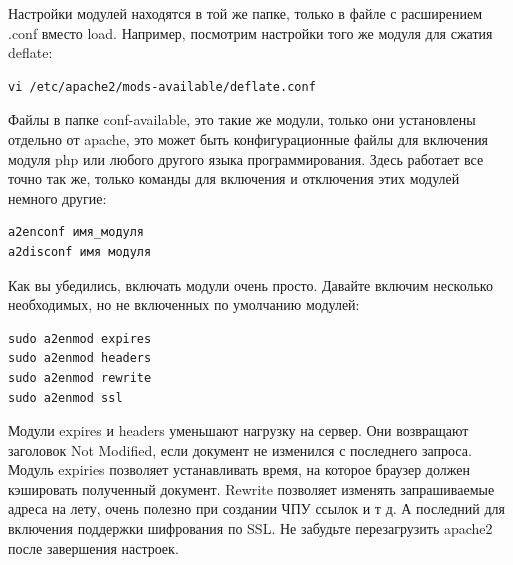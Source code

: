 \documentclass[14pt, a4paper]{article}
\begin{document}
Настройки модулей находятся в той же папке, только в файле с расширением .conf вместо load. 
Например, посмотрим настройки того же модуля для сжатия deflate:
\begin{lstlisting}
vi /etc/apache2/mods-available/deflate.conf
\end{lstlisting}
\begin{figure}[h]%
    \centering
    \label{1.10}
\end{figure}
Файлы в папке conf-available, это такие же модули, только они установлены отдельно от apache, это 
может быть конфигурационные файлы для включения модуля php или любого другого языка программирования. 
Здесь работает все точно так же, только команды для включения и отключения этих модулей немного другие:

\begin{lstlisting}
a2enconf имя_модуля
a2disconf имя модуля   
\end{lstlisting}

Как вы убедились, включать модули очень просто. Давайте включим несколько необходимых, 
но не включенных по умолчанию модулей:
\begin{lstlisting}
sudo a2enmod expires
sudo a2enmod headers
sudo a2enmod rewrite
sudo a2enmod ssl
\end{lstlisting}

Модули expires и headers уменьшают нагрузку на сервер. Они возвращают заголовок Not Modified, 
если документ не изменился с последнего запроса. Модуль expiries позволяет устанавливать время, 
на которое браузер должен кэшировать полученный документ. Rewrite позволяет изменять запрашиваемые 
адреса на лету, очень полезно при создании ЧПУ ссылок и т д. А последний для включения поддержки 
шифрования по SSL. Не забудьте перезагрузить apache2 после завершения настроек.
\end{document}

